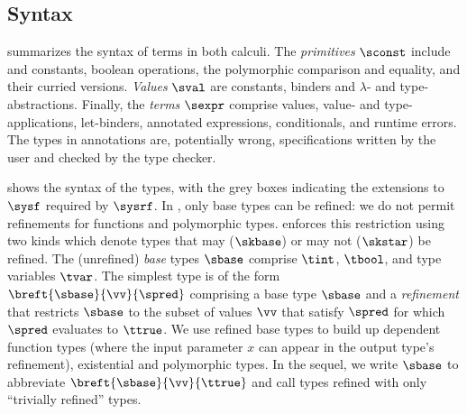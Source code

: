 \subsection{Syntax} \label{sec:lang:syntax}


%
 summarizes the 
syntax of terms in both calculi.
%
%
The \emph{primitives} $\sconst$
include \tint and \tbool constants, 
boolean operations, 
the polymorphic comparison and equality, 
and their curried versions.
%
%
\emph{Values} $\sval$ are 
constants, binders 
and $\lambda$- and type- abstractions.
%
Finally, the \emph{terms} $\sexpr$ comprise values,
value- and type- applications, let-binders, 
annotated expressions, conditionals, and runtime errors.
The types in annotations are, potentially wrong, specifications 
written by the user and checked by the type checker.  


%
 shows the syntax of the types,
with the grey boxes indicating the extensions to $\sysf$ 
required by $\sysrf$.
%
In \sysrf, only base types %
can be refined: we do not permit refinements 
for functions and polymorphic types. 
%
\sysrf enforces this restriction using two kinds
which denote types that may ($\skbase$) or may not ($\skstar$)
be refined.
%
The (unrefined) \emph{base} types $\sbase$ comprise 
$\tint$, $\tbool$, and type variables $\tvar$. 
%
The simplest type is of the form
$\breft{\sbase}{\vv}{\spred}$ 
comprising a base type $\sbase$ 
and a \emph{refinement} that restricts 
$\sbase$ to the subset of values 
$\vv$ that satisfy $\spred$ \ie 
for which $\spred$ evaluates to $\ttrue$.
%
We use refined base types to build up
dependent function types (where the input 
parameter $x$ can appear in the output type's 
refinement), existential and polymorphic 
types.
%
In the sequel, we write $\sbase$ to abbreviate 
$\breft{\sbase}{\vv}{\ttrue}$
and call types refined with only \ttrue 
``trivially refined'' types. 

